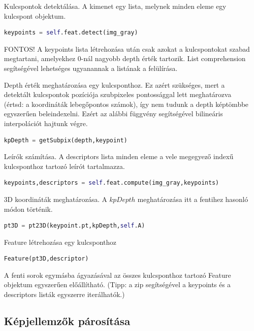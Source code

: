 \documentclass[12pt,a4paper,oneside]{report}             %
\begin{document}
Kulcspontok detektálása. A kimenet egy lista, melynek minden eleme egy kulcspont objektum.

\begin{lstlisting}[language=Python]
keypoints = self.feat.detect(img_gray)
\end{lstlisting}

FONTOS! A keypoints lista létrehozása után csak azokat a kulcspontokat szabad megtartani, amelyekhez $0$-nál nagyobb depth érték tartozik. List comprehension segítségével lehetséges ugyanannak a listának a felülírása.

Depth érték meghatározása egy kulcsponthoz. Ez azért szükséges, mert a detektált kulcspontok pozíciója szubpixeles pontossággal lett meghatározva (értsd: a koordináták lebegőpontos számok), így nem tudunk a depth képtömbbe egyszerűen beleindexelni. Ezért az alábbi függvény segítségével bilineáris interpolációt hajtunk végre.

\begin{lstlisting}[language=Python]
kpDepth = getSubpix(depth,keypoint)
\end{lstlisting}

Leírók számítása. A descriptors lista minden eleme a vele megegyező indexű kulcsponthoz tartozó leírót tartalmazza.

\begin{lstlisting}[language=Python]
keypoints,descriptors = self.feat.compute(img_gray,keypoints)
\end{lstlisting}

3D koordináták meghatározása. A $kpDepth$ meghatározása itt a fentihez hasonló módon történik.

\begin{lstlisting}[language=Python]
pt3D = pt23D(keypoint.pt,kpDepth,self.A)
\end{lstlisting}

Feature létrehozása egy kulcsponthoz

\begin{lstlisting}[language=Python]
Feature(pt3D,descriptor)
\end{lstlisting}

A fenti sorok egymásba ágyazásával az összes kulcsponthoz tartozó Feature objektum egyszerűen előállítható. (Tipp: a zip segítségével a keypoints és a descriptors listák egyszerre iterálhatók.)

\subsection{Képjellemzők párosítása}
\end{document}
